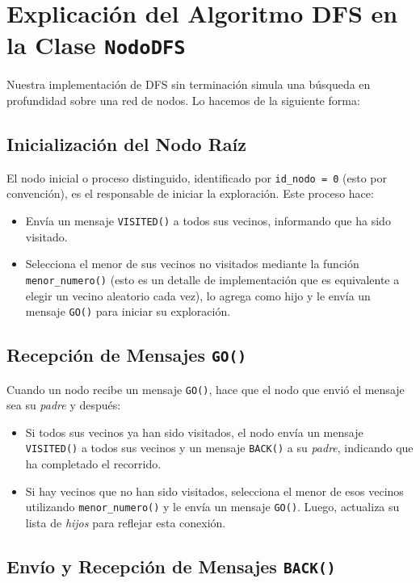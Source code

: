 \section{Explicación del Algoritmo DFS en la Clase \texttt{NodoDFS}}

Nuestra implementación de DFS sin terminación simula una búsqueda en profundidad sobre una red de nodos. Lo hacemos de la siguiente forma: 

\subsection{Inicialización del Nodo Raíz}

El nodo inicial o proceso distinguido, identificado por \texttt{id\_nodo = 0} (esto por convención), es el responsable de iniciar la exploración. Este proceso hace:

\begin{itemize}
	\item Envía un mensaje \texttt{VISITED()} a todos sus vecinos, informando que ha sido visitado.
	\item Selecciona el menor de sus vecinos no visitados mediante la función \texttt{menor\_numero()} (esto es un detalle de implementación que es equivalente a elegir un vecino aleatorio cada vez), lo agrega como hijo y le envía un mensaje \texttt{GO()} para iniciar su exploración.
\end{itemize}

\subsection{Recepción de Mensajes \texttt{GO()}}

Cuando un nodo recibe un mensaje \texttt{GO()}, hace que el nodo que envió el mensaje sea su \textit{padre} y después:

\begin{itemize}
	\item Si todos sus vecinos ya han sido visitados, el nodo envía un mensaje \texttt{VISITED()} a todos sus vecinos y un mensaje \texttt{BACK()} a su \textit{padre}, indicando que ha completado el recorrido. 
	\item Si hay vecinos que no han sido visitados, selecciona el menor de esos vecinos utilizando \texttt{menor\_numero()} y le envía un mensaje \texttt{GO()}. Luego, actualiza su lista de \textit{hijos} para reflejar esta conexión.
\end{itemize}

\subsection{Envío y Recepción de Mensajes \texttt{BACK()}}

